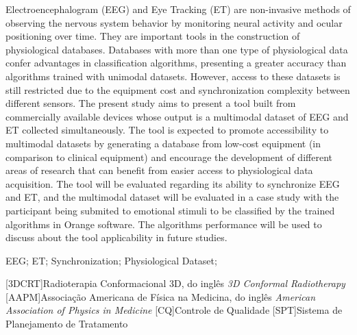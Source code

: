 \documentclass[a4paper, 12pt]{ppgeb}
\begin{document}
Electroencephalogram (EEG) and Eye Tracking (ET) are non-invasive methods of observing the nervous system behavior 
by monitoring neural activity and ocular positioning over time. They are important tools in the construction of physiological 
databases. Databases with more than one type of physiological data confer advantages in classification algorithms, 
presenting a greater accuracy than algorithms trained with unimodal datasets. However, access to these datasets is still restricted
 due to the equipment cost and synchronization complexity between different sensors. The present study aims to present a tool built 
 from commercially available devices whose output is a multimodal dataset of EEG and ET collected simultaneously. 
 The tool is expected to promote accessibility to multimodal datasets by generating a database from
low-cost equipment (in comparison to clinical equipment) and encourage the development of different areas of research 
that can benefit from easier access to physiological data acquisition. The tool will be evaluated regarding its ability 
to synchronize EEG and ET, and the multimodal dataset will be evaluated in a case study with the participant being submited to emotional 
stimuli to be classified by the trained algorithms in Orange software. The algorithms performance will be used to discuss about the 
tool applicability in future studies.

\vspace{14pt}

 EEG; ET; Synchronization; Physiological Dataset;
\acresetall %

\indice

\begin{center}

{\bfseries{} }%
\end{center}

[3DCRT]{Radioterapia Conformacional 3D, do inglês \emph{3D Conformal Radiotherapy}}
[AAPM]{Associação Americana de Física na Medicina, do inglês \emph{American Association of Physics in Medicine}}
[CQ]{Controle de Qualidade}
[SPT]{Sistema de Planejamento de Tratamento}

\begin{acronym}
\end{acronym}
\end{document}
